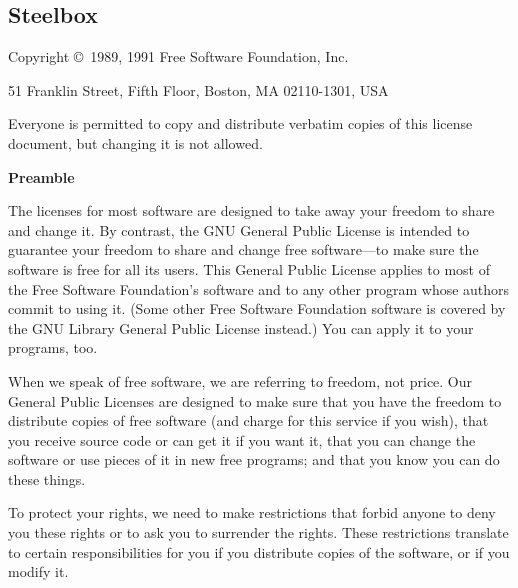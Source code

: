 \documentclass{article}
\begin{document}
    \subsection{Steelbox}
    \begin{center}
      {\parindent 0in
      
      Copyright \copyright\ 1989, 1991 Free Software Foundation, Inc.
      
      \bigskip
      
      51 Franklin Street, Fifth Floor, Boston, MA  02110-1301, USA
      
      \bigskip
      
      Everyone is permitted to copy and distribute verbatim copies
      of this license document, but changing it is not allowed.
      }
      \end{center}
      
      \begin{center}
      {\bf\large Preamble}
      \end{center}
      
      
      The licenses for most software are designed to take away your freedom to
      share and change it.  By contrast, the GNU General Public License is
      intended to guarantee your freedom to share and change free software---to
      make sure the software is free for all its users.  This General Public
      License applies to most of the Free Software Foundation's software and to
      any other program whose authors commit to using it.  (Some other Free
      Software Foundation software is covered by the GNU Library General Public
      License instead.)  You can apply it to your programs, too.
      
      When we speak of free software, we are referring to freedom, not price.
      Our General Public Licenses are designed to make sure that you have the
      freedom to distribute copies of free software (and charge for this service
      if you wish), that you receive source code or can get it if you want it,
      that you can change the software or use pieces of it in new free programs;
      and that you know you can do these things.
      
      To protect your rights, we need to make restrictions that forbid anyone to
      deny you these rights or to ask you to surrender the rights.  These
      restrictions translate to certain responsibilities for you if you
      distribute copies of the software, or if you modify it.
      
\end{document}
